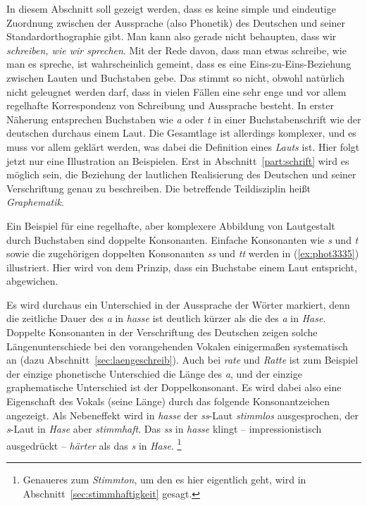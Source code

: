 \label{sec:orthographiegraphematik}


In diesem Abschnitt soll gezeigt werden, dass es keine simple und eindeutige Zuordnung zwischen der Aussprache (also Phonetik) des Deutschen und seiner Standardorthographie gibt.
Man kann also gerade nicht behaupten, dass wir \textit{schreiben, wie wir sprechen}.
Mit der Rede davon, dass man etwas schreibe, wie man es spreche, ist wahrscheinlich gemeint, dass es eine Eins-zu-Eins-Beziehung zwischen Lauten und Buchstaben gebe. 
Das stimmt so nicht, obwohl natürlich nicht geleugnet werden darf, dass in vielen Fällen eine sehr enge und vor allem regelhafte Korrespondenz von Schreibung und Aussprache besteht.
In erster Näherung entsprechen Buchstaben wie \textit{a} oder \textit{t} in einer Buchstabenschrift wie der deutschen durchaus einem Laut. 
Die Gesamtlage ist allerdings komplexer, und es muss vor allem geklärt werden, was dabei die Definition eines \textit{Lauts} ist.
Hier folgt jetzt nur eine Illustration an Beispielen.
Erst in Abschnitt~\ref{part:schrift} wird es möglich sein, die Beziehung der lautlichen Realisierung des Deutschen und seiner Verschriftung genau zu beschreiben.
Die betreffende Teildisziplin heißt \textit{Graphematik}.

Ein Beispiel für eine regelhafte, aber komplexere Abbildung von Lautgestalt durch Buchstaben sind doppelte Konsonanten.
Einfache Konsonanten wie \textit{s} und \textit{t} sowie die zugehörigen doppelten Konsonanten \textit{ss} und \textit{tt} werden in (\ref{ex:phot3335}) illustriert.
Hier wird von dem Prinzip, dass ein Buchstabe einem Laut entspricht, abgewichen.

\begin{exe}
  \ex\label{ex:phot3335}
  \begin{xlist}
  \end{xlist}
\end{exe}

Es wird durchaus ein Unterschied in der Aussprache der Wörter markiert, denn die zeitliche Dauer des \textit{a} in \textit{hasse} ist deutlich kürzer als die des \textit{a} in \textit{Hase}.
Doppelte Konsonanten in der Verschriftung des Deutschen zeigen solche Längenunterschiede bei den vorangehenden Vokalen einigermaßen systematisch an (dazu Abschnitt~\ref{sec:laengeschreib}).
Auch bei \textit{rate} und \textit{Ratte} ist zum Beispiel der einzige phonetische Unterschied die Länge des \textit{a}, und der einzige graphematische Unterschied ist der Doppelkonsonant.
Es wird dabei also eine Eigenschaft des Vokals (seine Länge) durch das folgende Konsonantzeichen angezeigt.
Als Nebeneffekt wird in \textit{hasse} der \textit{ss}-Laut \textit{stimmlos} ausgesprochen, der \textit{s}-Laut in \textit{Hase} aber \textit{stimmhaft}.
Das \textit{ss} in \textit{hasse} klingt -- impressionistisch ausgedrückt -- \textit{härter} als das \textit{s} in \textit{Hase}.%
\footnote{Genaueres zum \textit{Stimmton}, um den es hier eigentlich geht, wird in Abschnitt~\ref{sec:stimmhaftigkeit} gesagt.}

